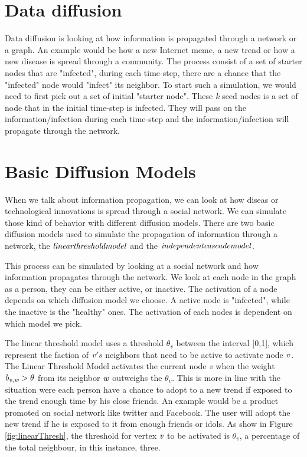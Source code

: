 \section{Data diffusion}
Data diffusion is looking at how information is propagated through a network or a graph. An example would be how a new Internet meme, a new trend or how a new disease is spread through a community. The process consist of a set of starter nodes that are "infected", during each time-step, there are a chance that the "infected" node would "infect" its neighbor. To start such a simulation, we would need to first pick out a set of initial "starter node". These {\it k} seed nodes is a set of node that in the initial time-step is infected. They will pass on the information/infection during each time-step and the information/infection will propagate through the network.

\section{Basic Diffusion Models}
When we talk about information propagation, we can look at how diseas or technological innovations is spread through a social network. We can simulate those kind of behavior with different diffusion models. There are two basic diffusion models used to simulate the propagation of information through a network\cite{MaximizeSpread2003}, the {$\it linear threshold model$} and the $\it{ independent cascade model}$\cite{MaximizeSpread2003}.

This process can be simulated by looking at a social network and how information propagates through the network. We look at each node in the graph as a person, they can be either active, or inactive. The activation of a node depends on which diffusion model we choose. A active node is "infected", while the inactive is the "healthy" ones. The activation of each nodes is dependent on which model we pick.

The linear threshold model uses a threshold $\theta_v$ between the interval [0,1], which represent the faction of $\it{v}'s$ neighbors that need to be active to activate node $\it{v}$. The Linear Threshold Model activates the current node {\it v} when the weight ${\it b_{v,w}} > \theta$ from its neighbor $\it{w}$ outweighs the $\theta_v$. This is more in line with the situation were each person have a chance to adopt to a new trend if exposed to the trend enough time by his close friends. An example would be a product promoted on social network like twitter and Facebook. The user will adopt the new trend if he is exposed to it from enough friends or idols. As show in Figure \ref{fig:linearThresh}, the threshold for vertex $\it{v}$ to be activated is $\theta_v$, a percentage of the total neighbour, in this instance, three.

